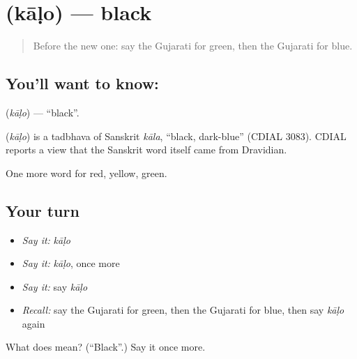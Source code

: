 \section[\texorpdfstring{\gu{કાળો} (kāḷo)}{કાળો (kāḷo)}]{ (kāḷo) — black}

\label{lesson:GU-C70-black}



\begin{quote}
Before the new one: say the Gujarati for green, then the Gujarati for blue.
\end{quote}

\subsection*{You'll want to know: }
\textbf{} (\emph{kāḷo}) — \textquotedblleft{}black\textquotedblright{}.

\begin{cousinweb}
\textbf{} (\emph{kāḷo}) is a tadbhava of Sanskrit \emph{kāla}, \textquotedblleft{}black, dark-blue\textquotedblright{} (CDIAL 3083). CDIAL reports a view that the Sanskrit word itself came from Dravidian.
\end{cousinweb}

\begin{grammarlens}[title={What you've built}]
One more word for red, yellow, green.
\end{grammarlens}

\subsection*{Your turn}
\begin{itemize}
\raggedright
  \item \emph{Say it:} \emph{kāḷo}
  \item \emph{Say it:} \emph{kāḷo}, once more
  \item \emph{Say it:} say \emph{kāḷo}
  \item \emph{Recall:} say the Gujarati for green, then the Gujarati for blue, then say \emph{kāḷo} again
\end{itemize}

\begin{tcolorbox}[breakable,colback=teal!4,colframe=teal!35!black,title={Before you move on}]
What does  mean? (\textquotedblleft{}Black\textquotedblright{}.) Say it once more.
\end{tcolorbox}
